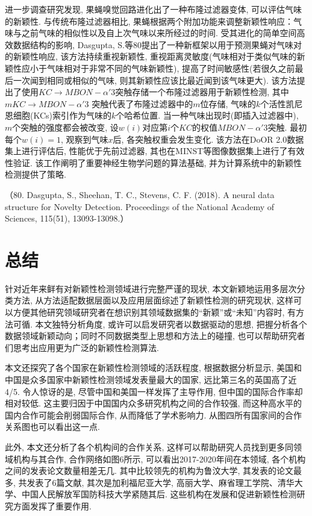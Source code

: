 \documentclass{Style/aas}
\begin{document}
\begin{multicols}{2}
进一步调查研究发现, 果蝇嗅觉回路进化出了一种布隆过滤器变体, 可以评估气味的新颖性. 与传统布隆过滤器相比, 果蝇根据两个附加功能来调整新颖性响应：气味与之前气味的相似性以及自上次气味以来所经过的时间. 受其进化的简单空间高效数据结构的影响, Dasgupta, S.等80提出了一种新框架以用于预测果蝇对气味对的新颖性响应, 该方法持续重视新颖性, 重视距离灵敏度(气味相对于类似气味的新颖性应小于气味相对于非常不同的气味新颖性), 提高了时间敏感性(若很久之前最后一次闻到相同或相似的气味, 则其新颖性应该比最近闻到该气味更大). 该方法提出了使用$KC\rightarrow MBON-\alpha{'}3$突触存储一个布隆过滤器用于新颖性检测, 其中$mKC\rightarrow MBON-\alpha{'}3$ 突触代表了布隆过滤器中的$m$位存储, 气味的$k$个活性凯尼恩细胞(KCs)索引作为气味的$k$个哈希位置. 当一种气味出现时(即插入过滤器中), $m$个突触的强度都会被改变, 设$w\left( i \right)$对应第$i$个$KC$的权值$MBON-\alpha'3$突触. 最初每个$w\left( i \right) =1$, 观察到气味$x$后, 各突触权重会发生变化. 该方法在DoOR 2.0数据集上进行评估后, 性能优于先前过滤器, 其也在MINST等图像数据集上进行了有效性验证. 该工作阐明了重要神经生物学问题的算法基础, 并为计算系统中的新颖性检测提供了策略.

（80.	Dasgupta, S., Sheehan, T. C., Stevens, C. F. (2018). A neural data structure for Novelty Detection. Proceedings of the National Academy of Sciences, 115(51), 13093-13098.）


\section{总结}

针对近年来鲜有对新颖性检测领域进行完整严谨的现状, 本文新颖地运用多层次分类方法, 从方法适配数据层面以及应用层面综述了新颖性检测的研究现状, 这样可以方便其他研究领域研究者在想识别其领域数据集的“新颖”或“未知”内容时, 有方法可循. 本文独特分析角度, 或许可以启发研究者以数据驱动的思想, 把握分析各个数据领域新颖动向；同时不同数据类型上思想和方法上的碰撞, 也可以帮助研究者们思考出应用更为广泛的新颖性检测算法. 

本文还探究了各个国家在新颖性检测领域的活跃程度, 根据数据分析显示, 美国和中国是众多国家中新颖性检测领域发表量最大的国家, 远比第三名的英国高了近4/5. 令人惊讶的是, 尽管中国和美国一样发挥了主导作用, 但中国的国际合作率却相对较低. 这主要归因于中国国内众多研究机构之间的合作较强, 而这种高水平的国内合作可能会削弱国际合作, 从而降低了学术影响力. 从图四所有国家间的合作关系图也可以看出这一点. 

此外, 本文还分析了各个机构间的合作关系, 这样可以帮助研究人员找到更多同领域机构与其合作, 合作网络如图6所示, 可以看出2017-2020年间在本领域, 各个机构之间的发表论文数量相差无几. 其中比较领先的机构为鲁汶大学, 其发表的论文最多, 共发表了6篇文献, 其次是加利福尼亚大学, 高丽大学、麻省理工学院、清华大学、中国人民解放军国防科技大学紧随其后. 这些机构在发展和促进新颖性检测研究方面发挥了重要作用.









\end{multicols}
\end{document}
